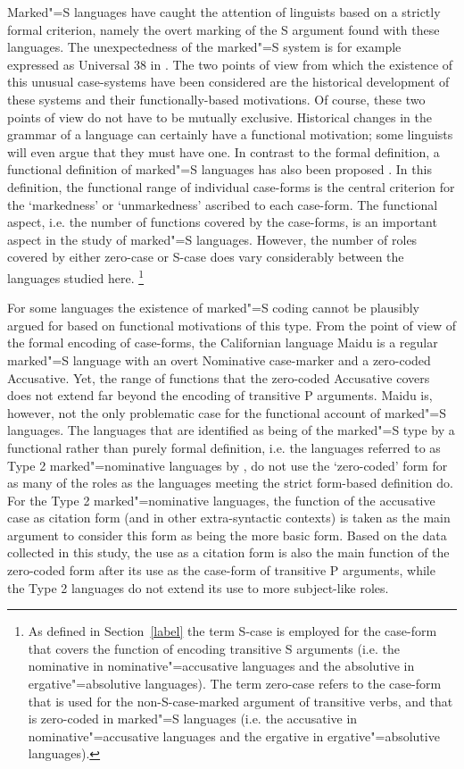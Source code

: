 Marked"=S languages have caught the attention of linguists based on a strictly formal criterion, namely the overt marking of the S argument found with these languages. 
The unexpectedness of the marked"=S system is for example expressed as Universal 38 in \citet[75]{Greenberg:1963}.
The two points of view from which the existence of this unusual case-systems have been considered are  the historical development of these systems and their functionally-based motivations. Of course, these two points of view do not have to be mutually exclusive. Historical changes in the grammar of a language can certainly have a functional motivation; some linguists will even argue that they must have one. 
In contrast to the formal definition, a functional definition of marked"=S languages has also been proposed \citep{Koenig:2006}. 
In this definition, the functional range of individual case-forms is the central criterion for the `markedness' or `unmarkedness' ascribed to each case-form.
The functional aspect, i.e. the number of functions covered by the case-forms, is an important aspect in the study of marked"=S languages.  
 However, the number of roles covered by either zero-case or S-case does vary considerably between the languages studied here.
\footnote{As defined in Section~\ref{label} the term S-case is employed for the case-form that covers the function of encoding transitive S arguments (i.e. the nominative in nominative"=accusative languages and the absolutive in ergative"=absolutive languages). The term zero-case refers to the case-form that is used for the non-S-case-marked argument of transitive verbs, and that is zero-coded in marked"=S languages (i.e. the accusative in nominative"=accusative languages and the ergative in ergative"=absolutive languages).}

For some languages the existence of marked"=S coding cannot be plausibly argued for based on functional motivations of this type.
From the point of view of the formal encoding of case-forms, the Californian language Maidu is a regular marked"=S language with an overt Nominative case-marker and a zero-coded Accusative. 
Yet, the range of functions that the zero-coded Accusative covers does not extend far beyond the encoding of transitive P arguments. 
Maidu is, however, not the only problematic case for the functional account of marked"=S languages. 
The languages that are identified as being of the marked"=S type by a functional rather than purely formal definition, i.e. the languages referred to as Type 2 marked"=nominative languages by \citet[658]{Koenig:2006}, do not use the `zero-coded' form for as many of the roles as the languages meeting the strict form-based definition do.  
For the Type 2 marked"=nominative languages, the function of the accusative case as citation form (and in other extra-syntactic contexts) is taken as the main argument to consider this form as being the more basic form. 
Based on the data collected in this study, the use as a citation form is also the main function of the zero-coded form after its use as the case-form of transitive P arguments, while the Type 2 languages do not extend its use to more subject-like roles.

